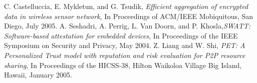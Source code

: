 \documentclass[12pt,a4paper,twoside]{report}
\begin{document}
\begin{thebibliography}{01}
 C. Castelluccia, E. Mykletun, and G. Tsudik, \emph{Efficient aggregation of encrypted data in wireless sensor network}, In Proceedings of ACM/IEEE Mobiquitous, San Diego, July 2005.
 A. Seshadri, A. Perrig, L. Van Doorn, and P. Khosla,\emph{SWATT: Software-based attestation for embedded devices}, In Proceedings of the IEEE Symposium on Security and Privacy, May 2004.
 Z. Liang and W. Shi, \emph{PET: A Personalized Trust model with reputation and risk evaluation for P2P resource sharing}, In Proceedings of the HICSS-38, Hilton Waikoloa Village Big Island, Hawaii, January 2005.
\end{thebibliography}

\iffalse
\end{document}
